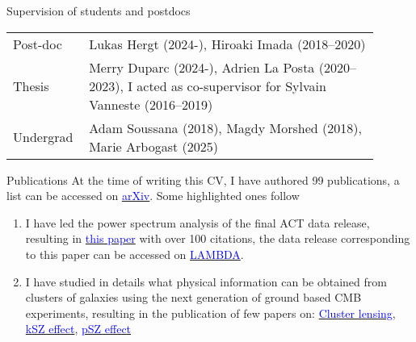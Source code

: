 \documentclass{resume} %
\newcommand{\TIB}[1]{\textcolor{blue}{#1}}
\begin{document}
\vspace{-0.6cm}

\begin{rSection}{Supervision of	students and postdocs}
\vspace{-0.4cm}

\begin{table}[h]
{\def\arraystretch{1.5}\tabcolsep=0pt
\begin{tabular}{p{0.15\linewidth}p{0.75\linewidth}}
Post-doc  & Lukas Hergt (2024-), Hiroaki Imada (2018--2020) \\
Thesis  & Merry Duparc (2024-),  Adrien La Posta (2020--2023), I acted as co-supervisor for Sylvain Vanneste (2016--2019) \\
Undergrad   & Adam Soussana (2018), Magdy Morshed (2018), Marie Arbogast (2025)
\end{tabular}%
}
\end{table}
\end{rSection}

\vspace{-0.6cm}


\begin{rSection}{Publications}
At the time of writing this CV, I have authored 99 publications, a list can be accessed on \href{https://arxiv.org/search/astro-ph?searchtype=author&query=Louis\%2C+T}{\TIB{arXiv}}. Some highlighted ones follow
\begin{enumerate}
\item I have led the power spectrum analysis of the final ACT data release, resulting in \href{https://arxiv.org/abs/2503.14452}{\TIB{this paper}} with over 100 citations, the data release corresponding to this paper can be accessed on \href{https://lambda.gsfc.nasa.gov/product/act/act_dr6.02/}{\TIB{LAMBDA}}.
\item I have studied in details what physical information can be obtained from clusters of galaxies using the next generation of ground based CMB experiments, resulting in the publication of few papers on: \href{https://ui.adsabs.harvard.edu/abs/2017PhRvD..95d3517L}{ \TIB{Cluster lensing}},  \href{https://ui.adsabs.harvard.edu/abs/2016PhRvD..94d3522A}{ \TIB{kSZ effect}}, \href{https://journals.aps.org/prd/abstract/10.1103/PhysRevD.96.123509}{\TIB{pSZ effect}} \\

\end{enumerate}



\end{rSection}
\end{document}
